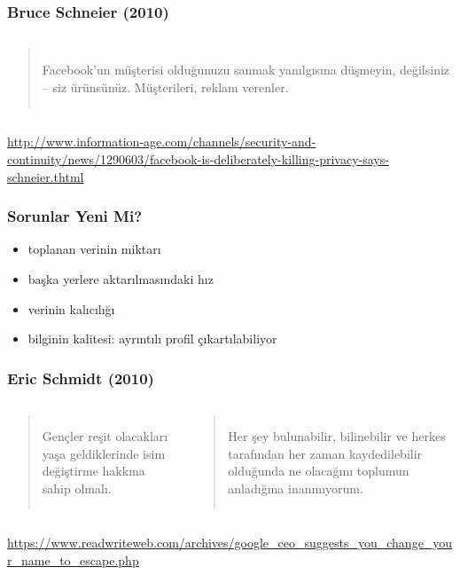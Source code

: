 \documentclass[dvipsnames]{beamer}
\theoremstyle{definition}
\theoremstyle{example}
\theoremstyle{plain}
\begin{document}
\begin{frame}
  \frametitle{Bruce Schneier (2010)}

  \begin{columns}

    \begin{quote}
      Facebook'un müşterisi olduğunuzu sanmak yanılgısına düşmeyin, değilsiniz
      -- siz ürünsünüz. Müşterileri, reklam verenler.
    \end{quote}
  \end{columns}

  \medskip
  \tiny{\url{http://www.information-age.com/channels/security-and-continuity/news/1290603/facebook-is-deliberately-killing-privacy-says-schneier.thtml}}\\
\end{frame}

\begin{frame}
  \frametitle{Sorunlar Yeni Mi?}

  \begin{itemize}
    \item toplanan verinin miktarı
    \item başka yerlere aktarılmasındaki hız
    \item verinin kalıcılığı
    \item bilginin kalitesi: ayrıntılı profil çıkartılabiliyor
  \end{itemize}
\end{frame}

\begin{frame}
  \frametitle{Eric Schmidt (2010)}

  \begin{columns}

    \begin{quote}
      Gençler reşit olacakları yaşa geldiklerinde isim değiştirme hakkına sahip olmalı.
    \end{quote}

    \pause
    \begin{quote}
      Her şey bulunabilir, bilinebilir ve herkes tarafından her zaman
      kaydedilebilir olduğunda ne olacağını toplumun anladığına inanmıyorum.
    \end{quote}
  \end{columns}

  \medskip
  \tiny{\url{https://www.readwriteweb.com/archives/google_ceo_suggests_you_change_your_name_to_escape.php}}\\
\end{frame}
\end{document}
